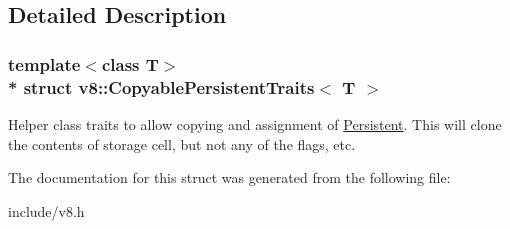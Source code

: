 \subsection{Detailed Description}
\subsubsection*{template$<$class T$>$\\*
struct v8\+::\+Copyable\+Persistent\+Traits$<$ T $>$}

Helper class traits to allow copying and assignment of \hyperlink{classv8_1_1_persistent}{Persistent}. This will clone the contents of storage cell, but not any of the flags, etc. 

The documentation for this struct was generated from the following file\+:\begin{DoxyCompactItemize}
\item 
include/v8.\+h\end{DoxyCompactItemize}
